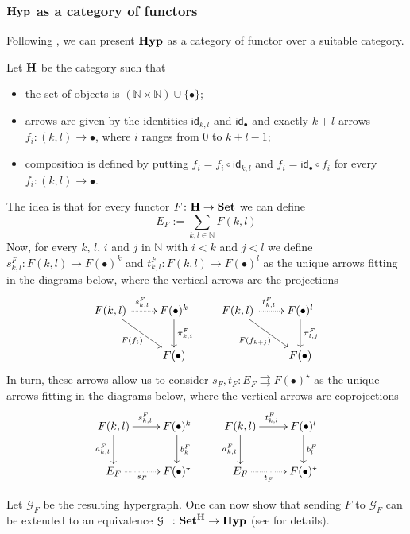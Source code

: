 \documentclass[a4paper,UKenglish,cleveref,pdftex,thm-restate,numberwithinsect]{lipics-v2021}
\newcommand{\Set}{\mathbf{Set}}
\newcommand{\catname}[1]{\textbf{\textup{#1}}}
\newcommand{\hyp}{\catname{Hyp}}
\newcommand{\id}[1]{\mathsf{id}_{#1}}
\begin{document}
\iffalse
\subsubsection{$\hyp$ as a category of functors}

Following \cite{bonchi2022string}, we can present $\hyp$ as a category of functor over a suitable category.

\begin{definition}Let $\catname{H}$ be the category such that
	\begin{itemize}
		\item the set of objects is $ (\mathbb{N}\times \mathbb{N}) \cup \{\bullet\}$;
		\item arrows are given by the identities $\id{k,l}$ and $\id{\bullet}$ and exactly $k+l$ arrows $f_i\colon (k,l)\rightarrow \bullet$, where $i$ ranges from $0$ to $k+l-1$;
		\item composition is defined by putting
			$f_i=f_i\circ \id{k,l}$ and $f_i = \id{\bullet}\circ f_i$
		for every $f_i\colon (k,l)\rightarrow \bullet$.
	\end{itemize}
\end{definition}

The idea is that for every functor $F\colon \catname{H}\to \catname{Set}$ we can define
\[E_F:=\sum_{k,l\in \mathbb{N}}F(k,l)\]
%
Now, for every $k$, $l$, $i$ and $j$ in $\mathbb{N}$ with $i< k$ and $j< l$ we define $s^F_{k,l}\colon F(k,l)\to F(\bullet)^k$ and  $t^F_{k,l}\colon F(k,l)\to F(\bullet)^l$ as the unique arrows fitting in the diagrams below, where the vertical arrows are the projections
\[\xymatrix{F(k,l)  \ar@{.>}[r]^{s^F_{k,l}} \ar[dr]_{F(f_i)}& F(\bullet)^{k} \ar[d]^{\pi^F_{k,i}} & F(k,l) \ar@{.>}[r]^{t^F_{k,l}} \ar[dr]_{F(f_{k+j})} & F(\bullet)^{l} \ar[d]^{\pi^F_{l,j}} \\ & F(\bullet) && F(\bullet)}\]
%
In turn, these arrows allow us to consider
$s_F, t_F\colon E_F\rightrightarrows F(\bullet)^{\star}$ as the unique arrows fitting in the diagrams below, where the vertical arrows are coprojections
\[\xymatrix{F(k,l) \ar[d]_{a^F_{k,l}}  \ar[r]^{s^{F}_{k,l}}& F(\bullet)^{k} \ar[d]^{b^F_{k}} & F(k,l) \ar[d]_{a^F_{k,l}}  \ar[r]^{t^{F}_{k,l}}& F(\bullet)^{l} \ar[d]^{b^F_{l}}\\ E_F \ar@{.>}[r]_-{s_F}& F(\bullet)^\star & E_F \ar@{.>}[r]_-{t_F}& F(\bullet)^\star}\]

Let $\mathcal{G}_F$ be the resulting hypergraph. One can now show that  sending $F$ to $\mathcal{G}_F$ can be extended to an equivalence $\mathcal{G}_{-}\colon \Set^{\catname{H}}\to \hyp$ (see \cite{castelnovo2023thesis,CastelnovoGM24} for details).
\end{document}
